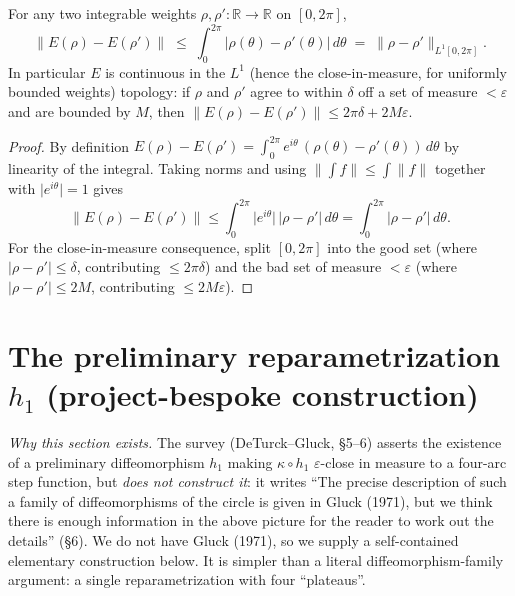 \begin{lemma}

  \label{lem:error_vector_lipschitz}
  For any two integrable weights $\rho, \rho' : \mathbb{R} \to \mathbb{R}$ on
  $[0,2\pi]$,
  \[
    \bigl\lVert E(\rho) - E(\rho')\bigr\rVert
      \;\le\; \int_0^{2\pi} \bigl\lvert \rho(\theta) - \rho'(\theta)\bigr\rvert \, d\theta
      \;=\; \lVert \rho - \rho'\rVert_{L^1[0,2\pi]} .
  \]
  In particular $E$ is continuous in the $L^1$ (hence the close-in-measure, for
  uniformly bounded weights) topology: if $\rho$ and $\rho'$ agree to within
  $\delta$ off a set of measure $<\varepsilon$ and are bounded by $M$, then
  $\lVert E(\rho) - E(\rho')\rVert \le 2\pi\delta + 2M\varepsilon$.
\end{lemma}
\begin{proof}
  \leanok
  By definition $E(\rho) - E(\rho') = \int_0^{2\pi} e^{i\theta}\,(\rho(\theta) -
  \rho'(\theta))\,d\theta$ by linearity of the integral. Taking norms and using
  $\lVert\int f\rVert \le \int \lVert f\rVert$ together with $\lvert e^{i\theta}
  \rvert = 1$ gives
  \[
    \lVert E(\rho) - E(\rho')\rVert
      \le \int_0^{2\pi} \lvert e^{i\theta}\rvert \, \lvert \rho - \rho'\rvert \, d\theta
      = \int_0^{2\pi} \lvert \rho - \rho'\rvert \, d\theta .
  \]
  For the close-in-measure consequence, split $[0,2\pi]$ into the good set (where
  $\lvert\rho-\rho'\rvert \le \delta$, contributing $\le 2\pi\delta$) and the bad
  set of measure $<\varepsilon$ (where $\lvert\rho-\rho'\rvert \le 2M$,
  contributing $\le 2M\varepsilon$).
\end{proof}

\section{The preliminary reparametrization \texorpdfstring{$h_1$}{h1} (project-bespoke construction)}

\noindent\emph{Why this section exists.} The survey
(DeTurck--Gluck, §5--6) asserts the existence of a preliminary
diffeomorphism $h_1$ making $\kappa\circ h_1$ $\varepsilon$-close in measure to a
four-arc step function, but \emph{does not construct it}: it writes ``The precise
description of such a family of diffeomorphisms of the circle is given in Gluck
(1971), but we think there is enough information in the above picture for the
reader to work out the details'' (§6). We do not have Gluck (1971), so we supply a
self-contained elementary construction below. It is simpler than a literal
diffeomorphism-family argument: a single reparametrization with four ``plateaus''.

